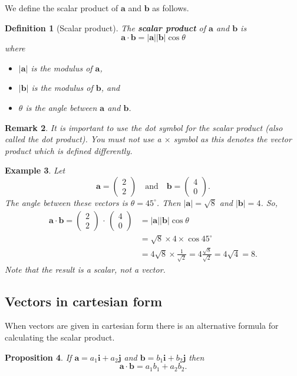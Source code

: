 \documentclass[12pt,a4paper]{article}
\renewcommand{\emph}{\textbf}
\theoremstyle{clearprint}
\newtheorem{proposition}{Proposition}[section]
\newtheorem{definition}[proposition]{Definition}
\newtheorem{remark}[proposition]{Remark}
\newtheorem{example}[proposition]{Example}
\newcommand{\bvec}[1]{\mathrm{\mathbf{#1}}}
\newcommand{\cvec}[2]{\begin{pmatrix} #1 \\ #2 \end{pmatrix}}
\newcommand{\vmod}[1]{\lvert #1 \rvert}
\begin{document}
We define the scalar product of \(\bvec{a}\) and \(\bvec{b}\) as follows. 

\begin{definition}[Scalar product]
The \emph{scalar product} of \(\bvec{a}\) and \(\bvec{b}\) is
\[
\bvec{a}\cdot \bvec{b} = \lvert\bvec{a}\rvert \lvert\bvec{b}\rvert \cos \theta
\]
where
\begin{itemize}
\item \(\lvert\bvec{a}\rvert\) is the modulus of \(\bvec{a}\),
\item \(\lvert\bvec{b}\rvert\) is the modulus of \(\bvec{b}\), and
\item \(\theta\) is the angle between \(\bvec{a}\) and \(\bvec{b}\). 
\end{itemize}
\end{definition}

\begin{remark}
It is important to use the dot symbol for the scalar product (also called the dot product). You must not use a \(\times\) symbol as this denotes the vector product which is defined differently. 
\end{remark}

\begin{example}
Let 
\[
\bvec{a} = \cvec{2}{2} \quad \text{and} \quad \bvec{b} = \cvec{4}{0}.
\]
The angle between these vectors is \(\theta = {45}^{\circ}\). Then \(\vmod{\bvec{a}} = \sqrt{8} \) and \(\vmod{\bvec{b}} = 4\). So, 
\begin{align*}
\bvec{a} \cdot \bvec{b} = \cvec{2}{2}\,\cdot\, \cvec{4}{0} &= \vmod{\bvec{a}}\vmod{\bvec{b}}\cos\theta \\
\,&= \sqrt{8} \times 4 \times \cos {45}^{\circ} \\
\,&= 4\sqrt{8}\times \frac{1}{\sqrt{2}} = 4\frac{\sqrt{8}}{\sqrt{2}} = 4\sqrt{4} = 8.
\end{align*} 
Note that the result is a scalar, not a vector. 
\end{example}

\subsection{Vectors in cartesian form}

When vectors are given in cartesian form there is an alternative formula for calculating the scalar product. 
\begin{proposition}
If \(\bvec{a} = a_1\bvec{i} + a_2\bvec{j}\) and \(\bvec{b} = b_1\bvec{i} + b_2\bvec{j}\) then
\[
\bvec{a} \cdot \bvec{b} = a_1b_1 + a_2b_2.
\]
\end{proposition}
\end{document}
